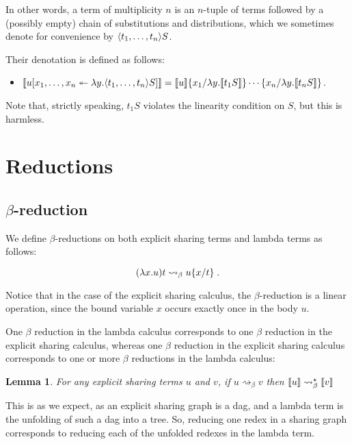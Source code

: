 \documentclass[10pt,a4paper]{article}
\theoremstyle{definition}
\theoremstyle{plain}
\newtheorem{lemma}[definition]{Lemma}
\theoremstyle{remark}
\begin{document}
In other words, a term of multiplicity $n$ is an $n$-tuple of terms followed by a (possibly empty) chain of substitutions and distributions, which we sometimes denote for convenience by ${ {\langle} {t_1},\dots,{t_n} {\rangle} }S$.

Their denotation is defined as follows:

\begin{itemize}
	\item ${\llbracket{ {  { {u}[{{x_1},\dots,{x_n}}\twoheadleftarrow{\lambda{y}.{ { {\langle} {t_1},\dots,{t_n} {\rangle} } S}}] }  } }\rrbracket}={{{\llbracket{u}\rrbracket}}\{{x_1}/{\lambda y.{\llbracket{t_1S}\rrbracket}}\}\cdots\{{x_n}/{\lambda y.{\llbracket{t_nS}\rrbracket}}\}}$.
\end{itemize}

Note that, strictly speaking, $t_1S$ violates the linearity condition on $S$, but this is harmless.

\section{Reductions}

\subsection{$\beta$-reduction}

We define $\beta$-reductions on both explicit sharing terms and lambda terms as follows:

\[(\lambda x.u)t \rightsquigarrow_\beta { {u}\{{x}/{t}\} }\;.\]

Notice that in the case of the explicit sharing calculus, the $\beta$-reduction is a linear operation, since the bound variable $x$ occurs exactly once in the body $u$.

One $\beta$ reduction in the lambda calculus corresponds to one $\beta$ reduction in the explicit sharing calculus, whereas one $\beta$ reduction in the explicit sharing calculus corresponds to one or more $\beta$ reductions in the lambda calculus:

\begin{lemma}
For any explicit sharing terms $u$ and $v$, if $u\rightsquigarrow_\beta v$ then ${\llbracket{u}\rrbracket}\rightsquigarrow^\star_\beta{\llbracket{v}\rrbracket}$
\end{lemma}

This is as we expect, as an explicit sharing graph is a dag, and a lambda term is the unfolding of such a dag into a tree. So, reducing one redex in a sharing graph corresponds to reducing each of the unfolded redexes in the lambda term.
\end{document}

